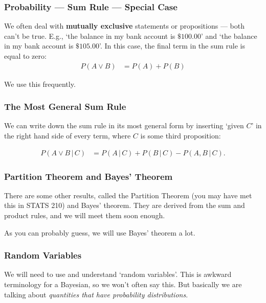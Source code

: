 \documentclass{beamer}
\newcommand{\given}{\,|\,}
\begin{document}
\begin{frame}
\frametitle{Probability --- Sum Rule --- Special Case}
We often deal with {\bf mutually exclusive} statements or propositions ---
both can't be true. E.g., `the balance in my bank account is $\$100.00$'
and `the balance in my bank account is $\$105.00$'.
In this case, the final term in the sum rule is equal to zero:
\begin{align}
P(A \vee B) &= P(A) + P(B)
\end{align}\pause

We use this frequently.


\end{frame}


\begin{frame}
\frametitle{The Most General Sum Rule}
We can write down the sum rule in its most general form by inserting
`given $C$' in the right hand side of every term, where $C$ is some third
proposition:

\begin{align}
P(A \vee B \given C) &= P(A \given C) + P(B \given C) - P(A, B \given C).
\end{align}

\end{frame}

\begin{frame}
\frametitle{Partition Theorem and Bayes' Theorem}
There are some other results, called the Partition Theorem
(you may have met this
in STATS 210) and Bayes' theorem. They are derived from the sum and product
rules, and we will meet them soon enough.\\[0.5em]\pause

As you can probably guess, we will use Bayes' theorem a lot.

\end{frame}



\begin{frame}
\frametitle{Random Variables}
We will need to use and understand `random variables'. This is awkward
terminology for a Bayesian, so we won't often say this. But basically
we are talking about {\em quantities that have probability distributions}.

\end{frame}
\end{document}
